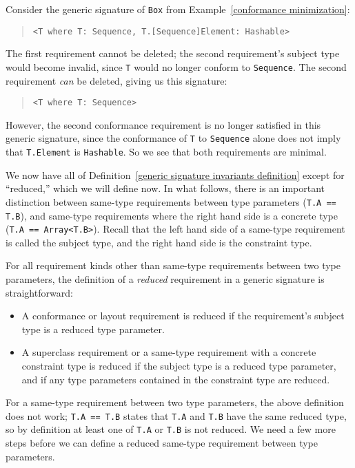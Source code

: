 \documentclass[../generics]{subfiles}
\begin{document}
\begin{example} Consider the generic signature of \verb|Box| from Example~\ref{conformance minimization}:
\begin{quote}
\begin{verbatim}
<T where T: Sequence, T.[Sequence]Element: Hashable>
\end{verbatim}
\end{quote}
The first requirement cannot be deleted; the second requirement's subject type would become invalid, since \texttt{T} would no longer conform to \texttt{Sequence}. The second requirement \emph{can} be deleted, giving us this signature:
\begin{quote}
\begin{verbatim}
<T where T: Sequence>
\end{verbatim}
\end{quote}
However, the second conformance requirement is no longer satisfied in this generic signature, since the conformance of \verb|T| to \verb|Sequence| alone does not imply that \verb|T.Element| is \verb|Hashable|. So we see that both requirements are minimal.
\end{example}
We now have all of Definition~\ref{generic signature invariants definition} except for ``reduced,'' which we will define now. In what follows, there is an important distinction between same-type requirements between type parameters (\verb|T.A == T.B|), and same-type requirements where the right hand side is a concrete type (\verb|T.A == Array<T.B>|). Recall that the left hand side of a same-type requirement is called the subject type, and the right hand side is the constraint type.
\begin{definition}
For all requirement kinds other than same-type requirements between two type parameters, the definition of a \emph{reduced} requirement in a generic signature is straightforward:
\begin{itemize}
\item A conformance or layout requirement is reduced if the requirement's subject type is a reduced type parameter.
\item A superclass requirement or a same-type requirement with a concrete constraint type is reduced if the subject type is a reduced type parameter, and if any type parameters contained in the constraint type are reduced.
\end{itemize}
\end{definition}
For a same-type requirement between two type parameters, the above definition does not work; \texttt{T.A == T.B} states that \texttt{T.A} and \texttt{T.B} have the same reduced type, so by definition at least one of \texttt{T.A} or \texttt{T.B} is not reduced. We need a few more steps before we can define a reduced same-type requirement between type parameters.
\end{document}
